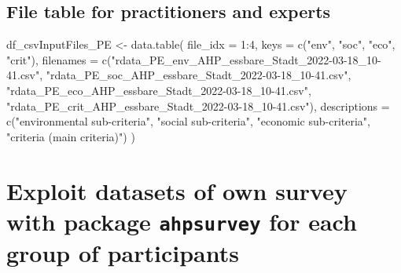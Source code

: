 \documentclass[
]{article}
\newenvironment{Shaded}{\begin{snugshade}}{\end{snugshade}}
\newcommand{\AttributeTok}[1]{\textcolor[rgb]{0.00,0.34,0.68}{#1}}
\newcommand{\DecValTok}[1]{\textcolor[rgb]{0.69,0.50,0.00}{#1}}
\newcommand{\FunctionTok}[1]{\textcolor[rgb]{0.39,0.29,0.61}{#1}}
\newcommand{\NormalTok}[1]{\textcolor[rgb]{0.12,0.11,0.11}{#1}}
\newcommand{\OtherTok}[1]{\textcolor[rgb]{0.00,0.43,0.16}{#1}}
\newcommand{\SpecialCharTok}[1]{\textcolor[rgb]{0.24,0.68,0.91}{#1}}
\newcommand{\StringTok}[1]{\textcolor[rgb]{0.75,0.01,0.01}{#1}}
\begin{document}
\hypertarget{file-table-for-practitioners-and-experts}{%
\subsection{File table for practitioners and
experts}\label{file-table-for-practitioners-and-experts}}

\begin{Shaded}
\begin{Highlighting}[]
\NormalTok{df\_csvInputFiles\_PE }\OtherTok{\textless{}{-}} \FunctionTok{data.table}\NormalTok{(}
  \AttributeTok{file\_idx =} \DecValTok{1}\SpecialCharTok{:}\DecValTok{4}\NormalTok{,}
  \AttributeTok{keys =} \FunctionTok{c}\NormalTok{(}\StringTok{"env"}\NormalTok{, }\StringTok{"soc"}\NormalTok{, }\StringTok{"eco"}\NormalTok{, }\StringTok{"crit"}\NormalTok{),}
  \AttributeTok{filenames =} \FunctionTok{c}\NormalTok{(}\StringTok{"rdata\_PE\_env\_AHP\_essbare\_Stadt\_2022{-}03{-}18\_10{-}41.csv"}\NormalTok{,}
                \StringTok{"rdata\_PE\_soc\_AHP\_essbare\_Stadt\_2022{-}03{-}18\_10{-}41.csv"}\NormalTok{,}
                \StringTok{"rdata\_PE\_eco\_AHP\_essbare\_Stadt\_2022{-}03{-}18\_10{-}41.csv"}\NormalTok{,}
                \StringTok{"rdata\_PE\_crit\_AHP\_essbare\_Stadt\_2022{-}03{-}18\_10{-}41.csv"}\NormalTok{),}
  \AttributeTok{descriptions =} \FunctionTok{c}\NormalTok{(}\StringTok{"environmental sub{-}criteria"}\NormalTok{,}
                   \StringTok{"social sub{-}criteria"}\NormalTok{,}
                   \StringTok{"economic sub{-}criteria"}\NormalTok{,}
                   \StringTok{"criteria (main criteria)"}\NormalTok{)}
\NormalTok{)}
\end{Highlighting}
\end{Shaded}

\hypertarget{exploit-datasets-of-own-survey-with-package-ahpsurvey-for-each-group-of-participants}{%
\section{\texorpdfstring{Exploit datasets of own survey with package
\texttt{ahpsurvey} for each group of
participants}{Exploit datasets of own survey with package ahpsurvey for each group of participants}}\label{exploit-datasets-of-own-survey-with-package-ahpsurvey-for-each-group-of-participants}}
\end{document}
